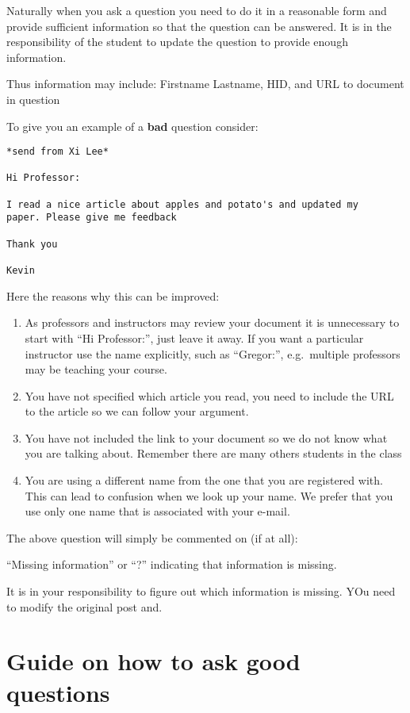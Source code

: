 Naturally when you ask a question you need to do it in a reasonable form
and provide sufficient information so that the question can be answered.
It is in the responsibility of the student to update the question to
provide enough information.

Thus information may include: Firstname Lastname, HID, and URL
to document in question

To give you an example of a \textbf{bad} question consider:

\begin{verbatim}
*send from Xi Lee*

Hi Professor:

I read a nice article about apples and potato's and updated my
paper. Please give me feedback

Thank you

Kevin
\end{verbatim}

Here the reasons why this can be improved:

\begin{enumerate}
\item
  As professors and instructors may review your document it is
  unnecessary to start with ``Hi Professor:'', just leave it away. If
  you want a particular instructor use the name explicitly, such as
  ``Gregor:'', e.g.\ multiple professors may be teaching your course.
\item
  You have not specified which article you read, you need to include the
  URL to the article so we can follow your argument.
\item
  You have not included the link to your document so we do not know what
  you are talking about. Remember there are many others students in the
  class
\item
  You are using a different name from the one that you are registered
  with. This can lead to confusion when we look up your name. We prefer
  that you use only one name that is associated with your e-mail.
\end{enumerate}

The above question will simply be commented on (if at all):

``Missing information'' or ``?'' indicating that information is missing.

It is in your responsibility to figure out which information is
missing. YOu need to modify the original post and.

\section{Guide on how to ask good questions}

